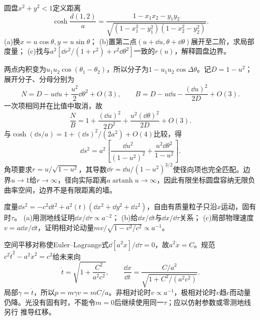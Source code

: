\begin{exercise}
圆盘$x^2+y^2<1$定义距离
\[
 \cosh\frac{d(1,2)}a=
 \frac{1-x_1x_2-y_1y_2}
 {\sqrt{(1-x_1^2-y_1^2)(1-x_2^2-y_2^2)}}.
\]
(a)换$x=u\cos\theta,y=u\sin\theta$；
(b)置第二点$(u+\dd u,\theta+\dd\theta)$展开至二阶，求局部度量；
(c)找与$a^2[\dd r^2/(1+r^2)+r^2\dd\theta^2]$一致的$r(u)$，解释圆盘边界。
\end{exercise}
\begin{solution}
两点内积变为$u_1u_2\cos(\theta_1-\theta_2)$，所以分子为$1-u_1u_2\cos\Delta\theta$。记$D=1-u^2$；展开分子、分母分别为
\[
 N=D-u\dd u+\frac{u^2}{2}\dd\theta^2+O(3),\qquad
 B=D-u\dd u-\frac{(\dd u)^2}{2D}+O(3).
\]
一次项相同并在比值中取消，故
\[
 \frac NB=1+\frac{(\dd u)^2}{2D^2}
 +\frac{u^2(\dd\theta)^2}{2D}+O(3).
\]
与$\cosh(\dd s/a)=1+(\dd s)^2/(2a^2)+O(4)$比较，得
\[
 \dd s^2=a^2\left[\frac{\dd u^2}{(1-u^2)^2}
 +\frac{u^2\dd\theta^2}{1-u^2}\right].
\]
角项要求$r=u/\sqrt{1-u^2}$，其导数$\dd r=\dd u/(1-u^2)^{3/2}$使径向项也完全匹配。边界$u\to1$给$r\to\infty$，径向实际距离$a\operatorname{artanh}u\to\infty$，因此有限坐标圆盘容纳无限负曲率空间，边界不是有限距离的墙。
\end{solution}

\begin{exercise}
度量$\dd s^2=-c^2\dd t^2+a^2(t)(\dd x^2+\dd y^2+\dd z^2)$，自由有质量粒子只沿$x$运动，固有时$\tau$。
(a)用测地线证明$\dd x/\dd\tau\propto a^{-2}$；
(b)给$\dd x/\dd t$与$\dd x/\dd\tau$关系；
(c)局部物理速度$v=a\dd x/\dd t$，证明相对论动量$mv/\sqrt{1-v^2/c^2}\propto a^{-1}$。
\end{exercise}
\begin{solution}
空间平移对称使Euler--Lagrange式$\dd[a^2\dot x]/\dd\tau=0$，故$a^2\dot x=C$。规范$c^2\dot t^2-a^2\dot x^2=c^2$给未来向
\[
 \dot t=\sqrt{1+\frac{C^2}{a^2c^2}},\qquad
 \frac{\dd x}{\dd t}=\frac{C/a^2}{\sqrt{1+C^2/(a^2c^2)}}.
\]
局部$\gamma=\dot t$，所以$p=m\gamma v=mC/a$。非相对论时$v\propto a^{-1}$，极相对论时$v$趋$c$而动量仍降。光没有固有时，不能令$m=0$后继续使用同一$\tau$；应以仿射参数或零测地线 另行 推导红移。
\end{solution}

